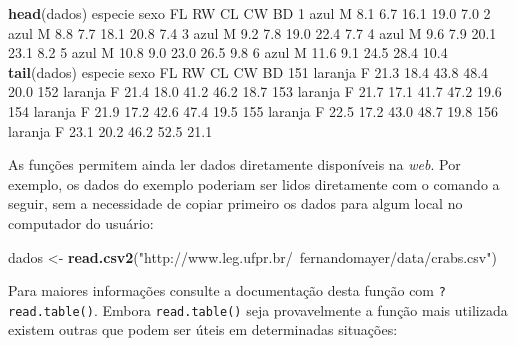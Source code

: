 \documentclass[10pt,a4paper]{book}
\newenvironment{Shaded}{\begin{snugshade}}{\end{snugshade}}
\newcommand{\KeywordTok}[1]{\textcolor[rgb]{0.13,0.29,0.53}{\textbf{#1}}}
\newcommand{\DecValTok}[1]{\textcolor[rgb]{0.00,0.00,0.81}{#1}}
\newcommand{\FloatTok}[1]{\textcolor[rgb]{0.00,0.00,0.81}{#1}}
\newcommand{\StringTok}[1]{\textcolor[rgb]{0.31,0.60,0.02}{#1}}
\newcommand{\NormalTok}[1]{#1}
\begin{document}
\begin{Shaded}
\begin{Highlighting}[]
\KeywordTok{head}\NormalTok{(dados)}
\NormalTok{  especie sexo   FL  RW   CL   CW   BD}
\DecValTok{1}\NormalTok{    azul    M  }\FloatTok{8.1} \FloatTok{6.7} \FloatTok{16.1} \FloatTok{19.0}  \FloatTok{7.0}
\DecValTok{2}\NormalTok{    azul    M  }\FloatTok{8.8} \FloatTok{7.7} \FloatTok{18.1} \FloatTok{20.8}  \FloatTok{7.4}
\DecValTok{3}\NormalTok{    azul    M  }\FloatTok{9.2} \FloatTok{7.8} \FloatTok{19.0} \FloatTok{22.4}  \FloatTok{7.7}
\DecValTok{4}\NormalTok{    azul    M  }\FloatTok{9.6} \FloatTok{7.9} \FloatTok{20.1} \FloatTok{23.1}  \FloatTok{8.2}
\DecValTok{5}\NormalTok{    azul    M }\FloatTok{10.8} \FloatTok{9.0} \FloatTok{23.0} \FloatTok{26.5}  \FloatTok{9.8}
\DecValTok{6}\NormalTok{    azul    M }\FloatTok{11.6} \FloatTok{9.1} \FloatTok{24.5} \FloatTok{28.4} \FloatTok{10.4}
\KeywordTok{tail}\NormalTok{(dados)}
\NormalTok{    especie sexo   FL   RW   CL   CW   BD}
\DecValTok{151}\NormalTok{ laranja    F }\FloatTok{21.3} \FloatTok{18.4} \FloatTok{43.8} \FloatTok{48.4} \FloatTok{20.0}
\DecValTok{152}\NormalTok{ laranja    F }\FloatTok{21.4} \FloatTok{18.0} \FloatTok{41.2} \FloatTok{46.2} \FloatTok{18.7}
\DecValTok{153}\NormalTok{ laranja    F }\FloatTok{21.7} \FloatTok{17.1} \FloatTok{41.7} \FloatTok{47.2} \FloatTok{19.6}
\DecValTok{154}\NormalTok{ laranja    F }\FloatTok{21.9} \FloatTok{17.2} \FloatTok{42.6} \FloatTok{47.4} \FloatTok{19.5}
\DecValTok{155}\NormalTok{ laranja    F }\FloatTok{22.5} \FloatTok{17.2} \FloatTok{43.0} \FloatTok{48.7} \FloatTok{19.8}
\DecValTok{156}\NormalTok{ laranja    F }\FloatTok{23.1} \FloatTok{20.2} \FloatTok{46.2} \FloatTok{52.5} \FloatTok{21.1}
\end{Highlighting}
\end{Shaded}

As funções permitem ainda ler dados diretamente disponíveis na
\emph{web}. Por exemplo, os dados do exemplo poderiam ser lidos
diretamente com o comando a seguir, sem a necessidade de copiar primeiro
os dados para algum local no computador do usuário:

\begin{Shaded}
\begin{Highlighting}[]
\NormalTok{dados <-}\StringTok{ }\KeywordTok{read.csv2}\NormalTok{(}\StringTok{"http://www.leg.ufpr.br/~fernandomayer/data/crabs.csv"}\NormalTok{)}
\end{Highlighting}
\end{Shaded}

Para maiores informações consulte a documentação desta função com
\texttt{?read.table()}. Embora \texttt{read.table()} seja provavelmente
a função mais utilizada existem outras que podem ser úteis em
determinadas situações:
\end{document}
